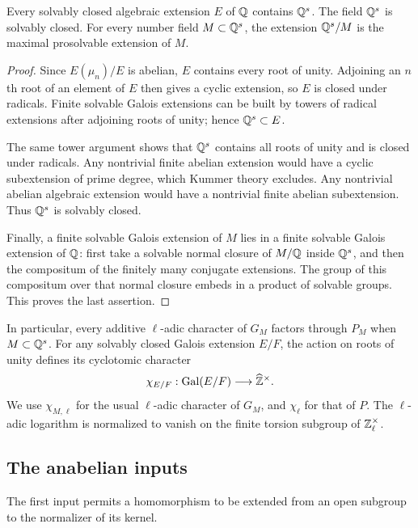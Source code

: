 \begin{lemma}\label{lem:solvable-closure}
Every solvably closed algebraic extension $E$ of $\mathbb Q$ contains $\mathbb Q^s$. The field $\mathbb Q^s$ is solvably closed. For every number field $M\subset\mathbb Q^s$, the extension $\mathbb Q^s/M$ is the maximal prosolvable extension of $M$.
\end{lemma}
\begin{proof}
Since $E(\mu_n)/E$ is abelian, $E$ contains every root of unity. Adjoining an $n$th root of an element of $E$ then gives a cyclic extension, so $E$ is closed under radicals. Finite solvable Galois extensions can be built by towers of radical extensions after adjoining roots of unity; hence $\mathbb Q^s\subset E$.

The same tower argument shows that $\mathbb Q^s$ contains all roots of unity and is closed under radicals. Any nontrivial finite abelian extension would have a cyclic subextension of prime degree, which Kummer theory excludes. Any nontrivial abelian algebraic extension would have a nontrivial finite abelian subextension. Thus $\mathbb Q^s$ is solvably closed.

Finally, a finite solvable Galois extension of $M$ lies in a finite solvable Galois extension of $\mathbb Q$: first take a solvable normal closure of $M/\mathbb Q$ inside $\mathbb Q^s$, and then the compositum of the finitely many conjugate extensions. The group of this compositum over that normal closure embeds in a product of solvable groups. This proves the last assertion.
\end{proof}

In particular, every additive $\ell$-adic character of $G_M$ factors through $P_M$ when $M\subset\mathbb Q^s$. For any solvably closed Galois extension $E/F$, the action on roots of unity defines its cyclotomic character
\[
 \chi_{E/F}:\operatorname{Gal}(E/F)\longrightarrow\widehat{\mathbb Z}^{\times}.
\]
We use $\chi_{M,\ell}$ for the usual $\ell$-adic character of $G_M$, and $\chi_\ell$ for that of $P$. The $\ell$-adic logarithm is normalized to vanish on the finite torsion subgroup of $\mathbb Z_\ell^\times$.

\subsection{The anabelian inputs}
The first input permits a homomorphism to be extended from an open subgroup to the normalizer of its kernel.

